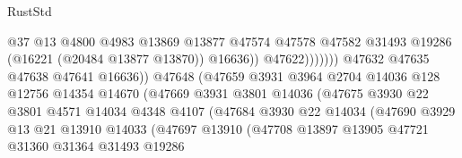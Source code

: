 \begin{lexlean}{RustStd}
\begin{coremodule}
                                                @37
                                                @13
                                                @4800
                                                @4983
                                                @13869
                                                @13877
                                                @47574
                                                @47578
                                                @47582
                                                @31493
                                                @19286
                                                (@16221 (@20484 @13877 @13870))
                                                @16636))
                                            @47622)))))))
                              @47632
                              @47635
                              @47638
                              @47641
                              @16636))
                          @47648
                          (@47659
                            @3931
                            @3964
                            @2704
                            @14036
                            @128
                            @12756
                            @14354
                            @14670
                            (@47669
                              @3931
                              @3801
                              @14036
                              (@47675
                                @3930
                                @22
                                @3801
                                @4571
                                @14034
                                @4348
                                @4107
                                (@47684
                                  @3930
                                  @22
                                  @14034
                                  (@47690
                                    @3929
                                    @13
                                    @21
                                    @13910
                                    @14033
                                    (@47697
                                      @13910
                                      (@47708
                                        @13897
                                        @13905
                                        @47721
                                        @31360
                                        @31364
                                        @31493
                                        @19286

\end{coremodule}
\end{lexlean}
